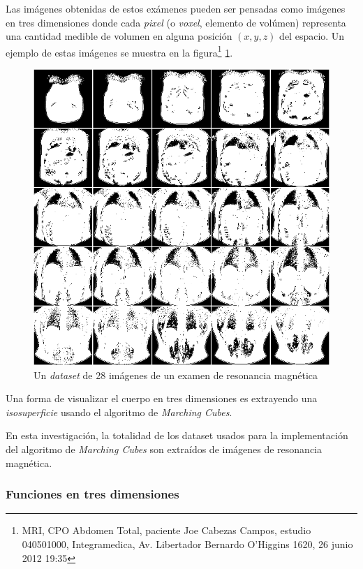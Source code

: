 Las imágenes obtenidas de estos exámenes pueden ser pensadas como imágenes en tres dimensiones donde cada \emph{pixel} (o \emph{voxel}, elemento de volúmen) representa una cantidad medible de volumen en alguna posición $(x, y, z)$ del espacio. Un ejemplo de estas imágenes se muestra en la figura\footnote{MRI, CPO Abdomen Total, paciente Joe Cabezas Campos, estudio 040501000, Integramedica, Av. Libertador Bernardo O'Higgins 1620, 26 junio 2012 19:35} \ref{f:flujoDeTrabajo:mri_joe}.

\begin{figure}[p]
\centering
	\includegraphics[width=1.0\textwidth]{images/misc/mri_joe.png}
\caption{Un \emph{dataset} de 28 imágenes de un examen de resonancia magnética}
\label{f:flujoDeTrabajo:mri_joe}
\end{figure}

Una forma de visualizar el cuerpo en tres dimensiones es extrayendo una \emph{isosuperficie} usando el algoritmo de \emph{Marching Cubes}.

En esta investigación, la totalidad de los dataset usados para la implementación del algoritmo de \emph{Marching Cubes} son extraídos de imágenes de resonancia magnética.
\newpage

\subsubsection{Funciones en tres dimensiones}
\label{ch:propuesta:sec:extraccionDeDatos:subsec:funcionesEnTresDimensiones}

